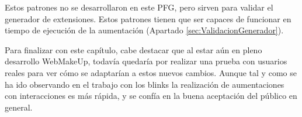 Estos patrones no se desarrollaron en este PFG, pero sirven para validar el generador de extensiones. Estos patrones tienen que ser capaces de funcionar en tiempo de ejecución de la aumentación (Apartado \ref{sec:ValidacionGenerador}).

Para finalizar con este capítulo, cabe destacar que al estar aún en pleno desarrollo WebMakeUp, todavía quedaría por realizar una prueba con usuarios reales para ver cómo se adaptarían a estos nuevos cambios. Aunque tal y como se ha ido observando en el trabajo con los blinks la realización de aumentaciones con interacciones es más rápida, y se confía en la buena aceptación del público en general.